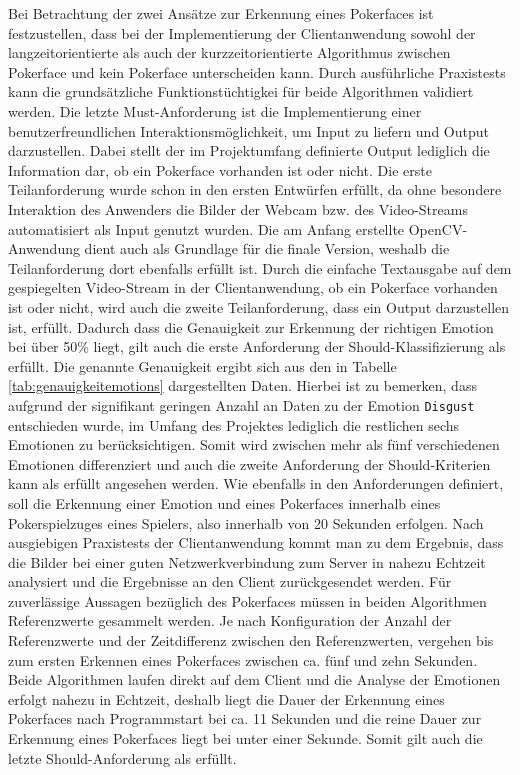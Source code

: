 \documentclass[12pt, a4paper]{report}
\begin{document}
Bei Betrachtung der zwei Ansätze zur Erkennung eines Pokerfaces ist festzustellen, dass bei der Implementierung der Clientanwendung sowohl der langzeitorientierte als auch der kurzzeitorientierte Algorithmus zwischen Pokerface und kein Pokerface unterscheiden kann. Durch ausführliche Praxistests kann die grundsätzliche Funktionstüchtigkei für beide Algorithmen validiert werden. Die letzte Must-Anforderung ist die Implementierung einer benutzerfreundlichen Interaktionsmöglichkeit, um Input zu liefern und Output darzustellen. Dabei stellt der im Projektumfang definierte Output lediglich die Information dar, ob ein Pokerface vorhanden ist oder nicht. Die erste Teilanforderung wurde schon in den ersten Entwürfen erfüllt, da ohne besondere Interaktion des Anwenders die Bilder der Webcam bzw. des Video-Streams automatisiert als Input genutzt wurden. Die am Anfang erstellte OpenCV-Anwendung dient auch als Grundlage für die finale Version, weshalb die Teilanforderung dort ebenfalls erfüllt ist. Durch die einfache Textausgabe auf dem gespiegelten Video-Stream in der Clientanwendung, ob ein Pokerface vorhanden ist oder nicht, wird auch die zweite Teilanforderung, dass ein Output darzustellen ist, erfüllt.\newline
Dadurch dass die Genauigkeit zur Erkennung der richtigen Emotion bei über 50\% liegt, gilt auch die erste Anforderung der Should-Klassifizierung als erfüllt. Die genannte Genauigkeit ergibt sich aus den in Tabelle \ref{tab:genauigkeitemotions} dargestellten Daten. Hierbei ist zu bemerken, dass aufgrund der signifikant geringen Anzahl an Daten zu der Emotion \texttt{Disgust} entschieden wurde, im Umfang des Projektes lediglich die restlichen sechs Emotionen zu berücksichtigen. Somit wird zwischen mehr als fünf verschiedenen Emotionen differenziert und auch die zweite Anforderung der Should-Kriterien kann als erfüllt angesehen werden. Wie ebenfalls in den Anforderungen definiert, soll die Erkennung einer Emotion und eines Pokerfaces innerhalb eines Pokerspielzuges eines Spielers, also innerhalb von 20 Sekunden erfolgen. Nach ausgiebigen Praxistests der Clientanwendung kommt man zu dem Ergebnis, dass die Bilder bei einer guten Netzwerkverbindung zum Server in nahezu Echtzeit analysiert und die Ergebnisse an den Client zurückgesendet werden. Für zuverlässige Aussagen bezüglich des Pokerfaces müssen in beiden Algorithmen Referenzwerte gesammelt werden. Je nach Konfiguration der Anzahl der Referenzwerte und der Zeitdifferenz zwischen den Referenzwerten, vergehen bis zum ersten Erkennen eines Pokerfaces zwischen ca. fünf und zehn Sekunden. Beide Algorithmen laufen direkt auf dem Client und die Analyse der Emotionen erfolgt nahezu in Echtzeit, deshalb liegt die Dauer der Erkennung eines Pokerfaces nach Programmstart bei ca. 11 Sekunden und die reine Dauer zur Erkennung eines Pokerfaces liegt bei unter einer Sekunde. Somit gilt auch die letzte Should-Anforderung als erfüllt.\newline
\end{document}
